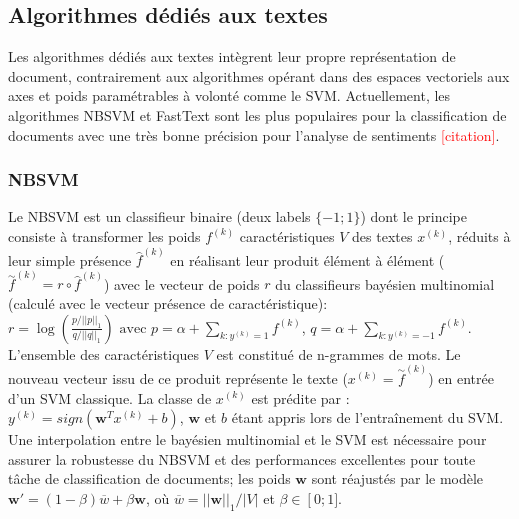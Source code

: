 

\subsection{Algorithmes dédiés aux textes}
Les algorithmes dédiés aux textes intègrent leur propre représentation de document, contrairement aux algorithmes opérant dans des espaces vectoriels aux axes et poids paramétrables à volonté comme le SVM.  Actuellement, les algorithmes NBSVM \citep{wang2012nbsvm} et FastText \citep{grave2017fasttextcls} sont les plus populaires pour la classification de documents avec une très bonne précision pour l'analyse de sentiments \textcolor{red}{[citation]}. 


\subsubsection{NBSVM}

Le NBSVM \citep{wang2012nbsvm} est un classifieur binaire (deux labels $\lbrace -1; 1 \rbrace$) dont le principe consiste à transformer les poids $f^{(k)}$ caractéristiques $V$ des textes $x^{(k)}$, réduits à leur simple présence $\widehat{f}^{(k)}$ en réalisant leur produit élément à élément ($\overset{\sim}{f}^{(k)} = {r} \circ \widehat{f}^{(k)}$) avec le vecteur de poids $r$ du classifieurs bayésien multinomial (calculé avec le vecteur présence de caractéristique):
$r = \log \left( \frac{p/\vert\vert p \vert\vert_1}{q / \vert\vert q \vert\vert_1}\right)
\text{ avec } p=\alpha + \sum\limits_{k:y^{(k)}=1}{f}^{(k)}$, $q=\alpha + \sum\limits_{k:y^{(k)}=-1}{f}^{(k)}$. L'ensemble des caractéristiques $V$ est constitué de n-grammes de mots. Le nouveau vecteur issu de ce produit représente le texte ($x^{(k)} = \overset{\sim}{f}^{(k)}$) en entrée d'un SVM classique. La classe de $x^{(k)}$ est prédite par : $y^{(k)} = sign(\mathbf{w}^Tx^{(k)} + b)$, $\mathbf{w}$ et $b$ étant appris lors de l'entraînement du SVM. Une interpolation  entre le bayésien multinomial et le SVM est nécessaire pour assurer la robustesse du NBSVM et des performances excellentes pour toute tâche de classification de documents; les poids $\mathbf{w}$ sont réajustés par le modèle $\mathbf{w'} = (1 - \beta) \overline{w} + \beta \mathbf{w}$, où $\overline{w} = \vert\vert \mathbf{w}\vert\vert_1 / \vert V \vert$ et $\beta \in \left[0; 1] \right.$. 
  

